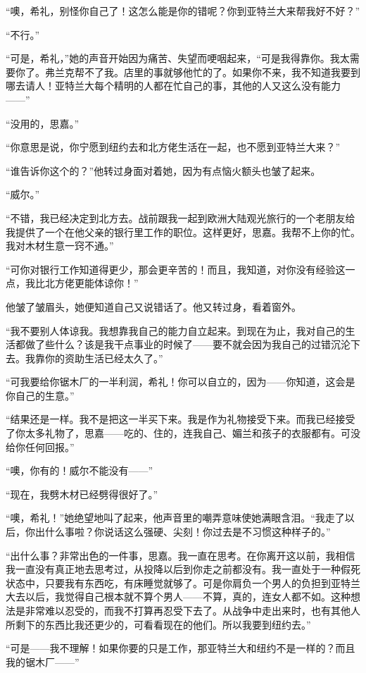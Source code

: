 \par “噢，希礼，别怪你自己了！这怎么能是你的错呢？你到亚特兰大来帮我好不好？”
\par “不行。”
\par “可是，希礼，”她的声音开始因为痛苦、失望而哽咽起来，“可是我得靠你。我太需要你了。弗兰克帮不了我。店里的事就够他忙的了。如果你不来，我不知道我要到哪去请人！亚特兰大每个精明的人都在忙自己的事，其他的人又这么没有能力——”
\par “没用的，思嘉。”
\par “你意思是说，你宁愿到纽约去和北方佬生活在一起，也不愿到亚特兰大来？”
\par “谁告诉你这个的？”他转过身面对着她，因为有点恼火额头也皱了起来。
\par “威尔。”
\par “不错，我已经决定到北方去。战前跟我一起到欧洲大陆观光旅行的一个老朋友给我提供了一个在他父亲的银行里工作的职位。这样更好，思嘉。我帮不上你的忙。我对木材生意一窍不通。”
\par “可你对银行工作知道得更少，那会更辛苦的！而且，我知道，对你没有经验这一点，我比北方佬更能体谅你！”
\par 他皱了皱眉头，她便知道自己又说错话了。他又转过身，看着窗外。
\par “我不要别人体谅我。我想靠我自己的能力自立起来。到现在为止，我对自己的生活都做了些什么？该是我干点事业的时候了——要不就会因为我自己的过错沉沦下去。我靠你的资助生活已经太久了。”
\par “可我要给你锯木厂的一半利润，希礼！你可以自立的，因为——你知道，这会是你自己的生意。”
\par “结果还是一样。我不是把这一半买下来。我是作为礼物接受下来。而我已经接受了你太多礼物了，思嘉——吃的、住的，连我自己、媚兰和孩子的衣服都有。可没给你任何回报。”
\par “噢，你有的！威尔不能没有——”
\par “现在，我劈木材已经劈得很好了。”
\par “噢，希礼！”她绝望地叫了起来，他声音里的嘲弄意味使她满眼含泪。“我走了以后，你出什么事啦？你说话这么强硬、尖刻！你过去是不习惯这种样子的。”
\par “出什么事？非常出色的一件事，思嘉。我一直在思考。在你离开这以前，我相信我一直没有真正地去思考过，从投降以后到你走之前都没有。我一直处于一种假死状态中，只要我有东西吃，有床睡觉就够了。可是你肩负一个男人的负担到亚特兰大去以后，我觉得自己根本就不算个男人——不算，真的，连女人都不如。这种想法是非常难以忍受的，而我不打算再忍受下去了。从战争中走出来时，也有其他人所剩下的东西比我还更少的，可看看现在的他们。所以我要到纽约去。”
\par “可是——我不理解！如果你要的只是工作，那亚特兰大和纽约不是一样的？而且我的锯木厂——”
